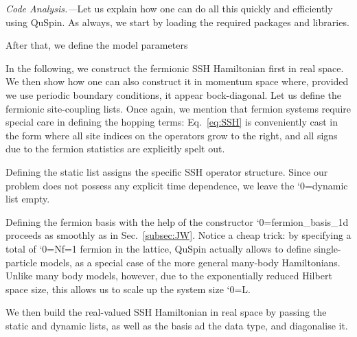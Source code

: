 \documentclass{SciPost}
\newcommand\0{\scalebox{-1}[1]{0}}
\let\svttfamily\ttfamily
\renewcommand\ttfamily{\svttfamily\catcode`0=\active }
\renewcommand\texttt{\bgroup\ttfamily\texttthelp}
\def\texttthelp#1{#1\egroup}
\newcommand{\SSHcode}{example5.py}
\begin{document}
\noindent\emph{Code Analysis.---}Let us explain how one can do all this quickly and efficiently using QuSpin. As always, we start by loading the required packages and libraries.

After that, we define the model parameters

In the following, we construct the fermionic SSH Hamiltonian first in real space. We then show how one can also construct it in momentum space where, provided we use periodic boundary conditions, it appear bock-diagonal. Let us define the fermionic site-coupling lists. Once again, we mention that fermion systems require special care in defining the hopping terms: Eq.~\eqref{eq:SSH} is conveniently cast in the form where all site indices on the operators grow to the right, and all signs due to the fermion statistics are explicitly spelt out.  

Defining the static list assigns the specific SSH operator structure. Since our problem does not possess any explicit time dependence, we leave the \texttt{dynamic} list empty.

Defining the fermion basis with the help of the constructor \texttt{fermion\_basis\_1d} proceeds as smoothly as in Sec.~\ref{subsec:JW}. Notice a cheap trick: by specifying a total of \texttt{Nf=1} fermion in the lattice, QuSpin actually allows to define single-particle models, as a special case of the more general many-body Hamiltonians. Unlike many body models, however, due to the exponentially reduced Hilbert space size, this allows us to scale up the system size \texttt{L}. 

We then build the real-valued SSH Hamiltonian in real space by passing the static and dynamic lists, as well as the basis ad the data type, and diagonalise it.

\end{document}
